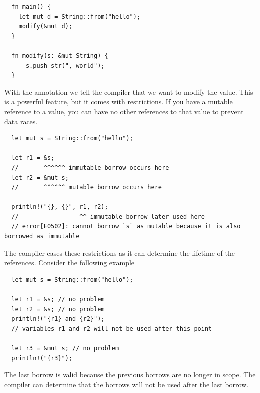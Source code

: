 \documentclass[11pt]{report}
\theoremstyle{definition}
\theoremstyle{plain}
\begin{document}
\begin{verbatim}
  fn main() {
    let mut d = String::from("hello");
    modify(&mut d);
  }
  
  fn modify(s: &mut String) {
      s.push_str(", world");
  }
 \end{verbatim}

With the  annotation we tell the compiler that we want to modify the value. This is a powerful feature, but it comes with restrictions. If you have a mutable reference to a value, you can have no other references to that value to prevent data races.
\begin{verbatim}
  let mut s = String::from("hello");

  let r1 = &s;
  //       ^^^^^^ immutable borrow occurs here
  let r2 = &mut s;
  //       ^^^^^^ mutable borrow occurs here

  println!("{}, {}", r1, r2);
  //                 ^^ immutable borrow later used here
  // error[E0502]: cannot borrow `s` as mutable because it is also borrowed as immutable
\end{verbatim}
The compiler eases these restrictions as it can determine the lifetime of the references. Consider the following example
\begin{verbatim}
  let mut s = String::from("hello");

  let r1 = &s; // no problem
  let r2 = &s; // no problem
  println!("{r1} and {r2}");
  // variables r1 and r2 will not be used after this point

  let r3 = &mut s; // no problem
  println!("{r3}");
\end{verbatim}
The last borrow is valid because the previous borrows are no longer in scope. The compiler can determine that the borrows will not be used after the last borrow.
\end{document}
